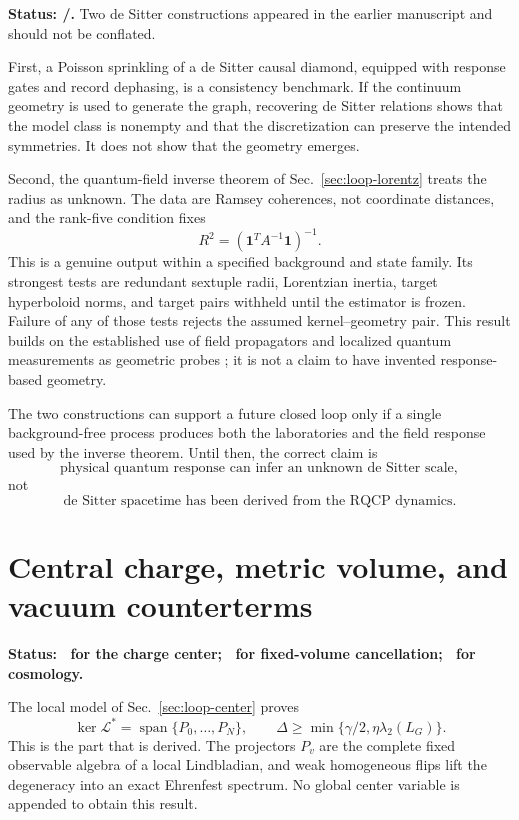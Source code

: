 \textbf{Status: \StatusNumerical/\StatusConditional.}
Two de Sitter constructions appeared in the earlier manuscript and should
not be conflated.

First, a Poisson sprinkling of a de Sitter causal diamond, equipped with
response gates and record dephasing, is a consistency benchmark.  If the
continuum geometry is used to generate the graph, recovering de Sitter
relations shows that the model class is nonempty and that the discretization
can preserve the intended symmetries.  It does not show that the geometry
emerges.

Second, the quantum-field inverse theorem of
Sec.~\ref{sec:loop-lorentz} treats the radius as unknown.  The data are Ramsey
coherences, not coordinate distances, and the rank-five condition fixes
\[
 R^2=(\mathbf1^TA^{-1}\mathbf1)^{-1}.
\]
This is a genuine output within a specified background and state family.
Its strongest tests are redundant sextuple radii, Lorentzian inertia,
target hyperboloid norms, and target pairs withheld until the estimator is
frozen.  Failure of any of those tests rejects the assumed kernel--geometry
pair.  This result builds on the established use of field propagators and
localized quantum measurements as geometric probes
\cite{SaravaniAslanbeigiKempf2016,PercheMartinMartinez2022}; it is not a
claim to have invented response-based geometry.

The two constructions can support a future closed loop only if a single
background-free process produces both the laboratories and the field
response used by the inverse theorem.  Until then, the correct claim is
\[
 \text{physical quantum response can infer an unknown de Sitter scale},
\]
not
\[
 \text{de Sitter spacetime has been derived from the RQCP dynamics}.
\]

\section{Central charge, metric volume, and vacuum counterterms}
\label{sec:updated-vacuum}

\textbf{Status: \StatusModel\ for the charge center;
\StatusConditional\ for fixed-volume cancellation;
\StatusOpen\ for cosmology.}

The local model of Sec.~\ref{sec:loop-center} proves
\begin{equation}
 \ker\mathcal L^*
 =\operatorname{span}\{P_0,\ldots,P_N\},
 \qquad
 \Delta\ge\min\{\gamma/2,\eta\lambda_2(L_G)\}.
 \label{eq:updated-charge-center}
\end{equation}
This is the part that is derived.  The projectors \(P_v\) are the complete
fixed observable algebra of a local Lindbladian, and weak homogeneous flips
lift the degeneracy into an exact Ehrenfest spectrum.  No global center
variable is appended to obtain this result.

